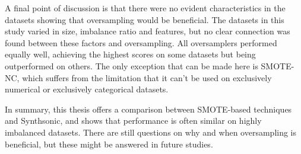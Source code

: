 A final point of discussion is that there were no evident characteristics in the datasets showing that oversampling would be beneficial. The datasets in this study varied in size, imbalance ratio and features, but no clear connection was found between these factors and oversampling. All oversamplers performed equally well, achieving the highest scores on some datasets but being outperformed on others. The only exception that can be made here is SMOTE-NC, which suffers from the limitation that it can't be used on exclusively numerical or exclusively categorical datasets.

In summary, this thesis offers a comparison between SMOTE-based techniques and Synthsonic, and shows that performance is often similar on highly imbalanced datasets. There are still questions on why and when oversampling is beneficial, but these might be answered in future studies.  